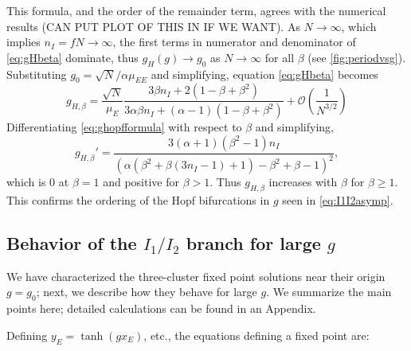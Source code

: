 \documentclass[11pt,reqno]{amsart}
\begin{document}
This formula, and the order of the remainder term, agrees with the numerical results (CAN PUT PLOT OF THIS IN IF WE WANT). As $N \rightarrow \infty$, which implies $n_I = f N \rightarrow \infty$, the first terms in numerator and denominator of \cref{eq:gHbeta} dominate, thus $g_H(g) \rightarrow g_0$ as $N \rightarrow \infty$ for all $\beta$ (see \cref{fig:periodvsg}). Substituting $g_0 = \sqrt{N}/\alpha \mu_{EE}$ and simplifying, equation \cref{eq:gHbeta} becomes
\begin{equation}\label{eq:ghopfformula}
g_{H,\beta} = 
\frac{\sqrt{N}}{\mu_E} 
\frac{ 3 \beta n_I  + 2(1 - \beta + \beta^2 ) }
{ 3 \alpha \beta n_I + (\alpha - 1)(1 - \beta + \beta^2 ) }
+ \mathcal{O}\left( \frac{1}{N^{3/2}} \right)
\end{equation}
Differentiating \cref{eq:ghopfformula} with respect to $\beta$ and simplifying,
\begin{equation}\label{eq:gprime}
g_{H,\beta}' = 
    \frac{ 
    3 (\alpha+1) \left(\beta^2-1\right) n_I
    }
    {
    \left(\alpha \left(\beta^2+\beta (3 n_I -1)+1\right)-\beta^2+\beta-1\right)^2},
\end{equation}
which is 0 at $\beta = 1$ and positive for $\beta > 1$. Thus $g_{H,\beta}$ increases with $\beta$ for $\beta \geq 1$. This confirms the ordering of the Hopf bifurcations in $g$ seen in \cref{eq:I1I2asymp}. 

\subsection{Behavior of the $I_1/I_2$ branch for large $g$} \label{sec:stab_largeg}
We have characterized the three-cluster fixed point solutions near their origin $g=g_0$; next, we describe how they behave for large $g$. We summarize the main points here; detailed calculations can be found in an Appendix.

Defining $y_E = \tanh(gx_E)$, etc., the equations defining a fixed point are:
\end{document}

